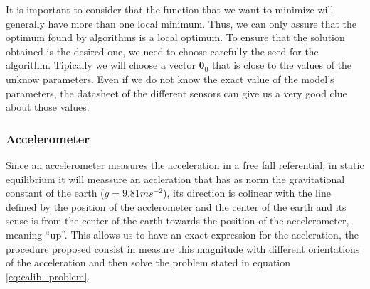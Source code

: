 \documentclass[conference]{IEEEtran}
\begin{document}
It is important to consider that the function that we want to minimize will generally have more than one local minimum. Thus, we can only assure that the optimum found by algorithms is a local optimum. To ensure that the solution obtained is the desired one, we need to choose carefully the seed for the algorithm. Tipically we will choose a vector $\boldsymbol{\theta}_0$ that is close to the values of the unknow parameters. Even if we do not know the exact value of the model's parameters, the datasheet of the different sensors can give us a very good clue about those values.\\

\subsubsection{Accelerometer}
\label{subsec:acc}
Since an accelerometer measures the acceleration in a free fall referential, in static equilibrium it will meassure an accleration that has as norm the gravitational constant of the  earth ($g = 9.81ms^{-2}$), its direction is colinear with the line defined by the position of the acclerometer and the center of the earth and its sense is from the center of the earth towards the position of the accelerometer, meaning ``up''. This allows us to have an exact expression for the accleration, the procedure proposed consist in measure this magnitude with different orientations of the acceleration and then solve the problem stated in equation \ref{eq:calib_problem}.\\
\end{document}
